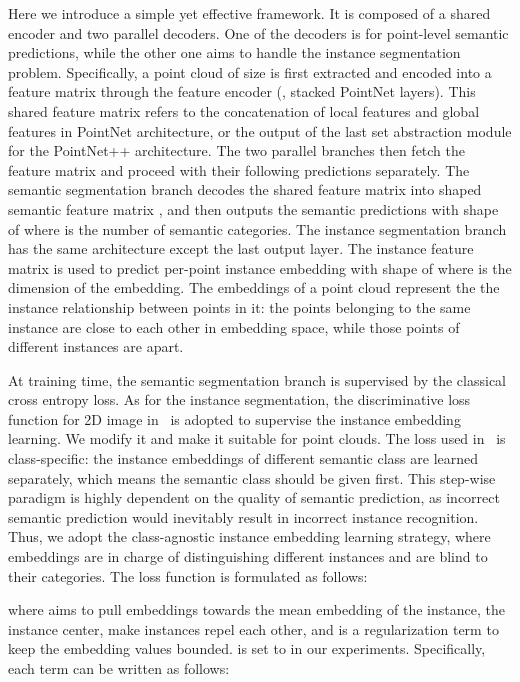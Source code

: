 \documentclass[10pt,twocolumn,letterpaper]{article}
\begin{document}
Here we introduce a simple yet effective framework.
It is composed of a shared encoder and two parallel decoders.
One of the decoders is for point-level semantic predictions, while the other one aims to handle the instance segmentation problem. 
Specifically, a point cloud of size  is first extracted and encoded  into a feature matrix through the feature encoder (\eg, stacked PointNet layers). 
This shared feature matrix refers to the concatenation of local features and global features in PointNet architecture, or the output of the last set abstraction module for the PointNet++ architecture.
The two parallel branches then fetch the feature matrix and proceed with their following predictions separately.
The semantic segmentation branch decodes the shared feature matrix into  shaped  semantic feature matrix , and then outputs the semantic predictions  with shape of  where  is the number of semantic categories. 
The instance segmentation branch has the same architecture except the last output layer.
The  instance feature matrix  is used to predict per-point instance embedding  with shape of  where  is the dimension of the embedding.
The embeddings of a point cloud represent the the instance relationship between points in it: the points belonging to the same instance are close to each other in embedding space, while those points of different instances are apart. 

At training time, the semantic segmentation branch is supervised by the classical cross entropy loss. 
As for the instance segmentation, the discriminative loss function for 2D image in~\cite{de2017semantic} is adopted to supervise the instance embedding learning.
We modify it and make it suitable for point clouds.
The loss used in~\cite{de2017semantic} is class-specific: the instance embeddings of different semantic class are learned separately, which means the semantic class should be given first.
This step-wise paradigm is highly dependent on the quality of semantic prediction, as incorrect semantic prediction would inevitably result in incorrect instance recognition.
Thus, we adopt the class-agnostic instance embedding learning strategy, where embeddings are in charge of distinguishing different instances and are blind to their categories. The loss function is formulated as follows:

where  aims to pull embeddings towards the mean embedding of the instance, \ie the instance center, 
 make instances repel each other, and  is a regularization term to keep the embedding values bounded.  is set to  in our experiments. Specifically, each term can be written as follows:
\end{document}
